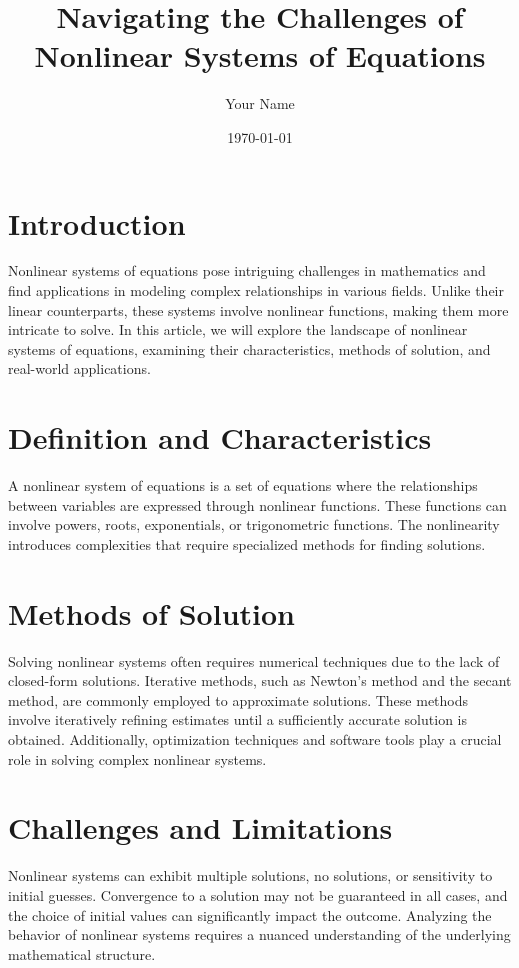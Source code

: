 \documentclass{article}
\title{Navigating the Challenges of Nonlinear Systems of Equations}
\author{Your Name}
\date{\today}
\begin{document}
\maketitle

\section*{Introduction}
Nonlinear systems of equations pose intriguing challenges in mathematics and find applications in modeling complex relationships in various fields. Unlike their linear counterparts, these systems involve nonlinear functions, making them more intricate to solve. In this article, we will explore the landscape of nonlinear systems of equations, examining their characteristics, methods of solution, and real-world applications.

\section*{Definition and Characteristics}
A nonlinear system of equations is a set of equations where the relationships between variables are expressed through nonlinear functions. These functions can involve powers, roots, exponentials, or trigonometric functions. The nonlinearity introduces complexities that require specialized methods for finding solutions.

\section*{Methods of Solution}
Solving nonlinear systems often requires numerical techniques due to the lack of closed-form solutions. Iterative methods, such as Newton's method and the secant method, are commonly employed to approximate solutions. These methods involve iteratively refining estimates until a sufficiently accurate solution is obtained. Additionally, optimization techniques and software tools play a crucial role in solving complex nonlinear systems.

\section*{Challenges and Limitations}
Nonlinear systems can exhibit multiple solutions, no solutions, or sensitivity to initial guesses. Convergence to a solution may not be guaranteed in all cases, and the choice of initial values can significantly impact the outcome. Analyzing the behavior of nonlinear systems requires a nuanced understanding of the underlying mathematical structure.
\end{document}
